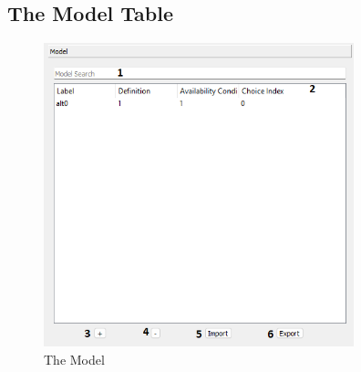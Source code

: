 \documentclass{article}
\begin{document}
\subsection{The Model Table} \label{sec:model}
\begin{figure}[H]%
  \centering
  \includegraphics[width=9cm]{docs/User Manual/img/ModelWidget.png}
  \caption{The Model}
  \label{fig:model} 
\end{figure}
\end{document}
